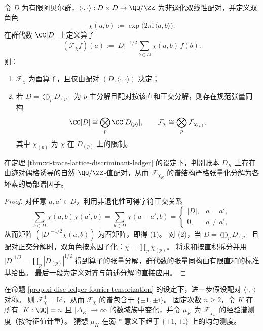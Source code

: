 \begin{proposition}[判别账本的规范有限傅里叶算子与素分解张量化]\label{prop:xi-disc-ledger-fourier-tensorization}
令 \(D\) 为有限阿贝尔群，\(\langle\cdot,\cdot\rangle:D\times D\to \QQ/\ZZ\) 为非退化双线性配对，并定义双角色
\[
\chi(a,b):=\exp\!\bigl(2\pi \mathrm{i}\,\langle a,b\rangle\bigr).
\]
在群代数 \(\CC[D]\) 上定义算子
\[
(\mathcal F_\chi f)(a):=|D|^{-1/2}\sum_{b\in D}\chi(a,b)\,f(b).
\]
则：
\begin{enumerate}
  \item \(\mathcal F_\chi\) 为酉算子，且仅由配对 \((D,\langle\cdot,\cdot\rangle)\) 决定；
  \item 若 \(D=\bigoplus_{p}D_{(p)}\) 为 \(p\)-主分解且配对按该直和正交分解，则存在规范张量同构
  \[
  \CC[D]\cong \bigotimes_p \CC[D_{(p)}],
  \qquad
  \mathcal F_\chi\cong \bigotimes_p \mathcal F_{\chi_{(p)}},
  \]
  其中 \(\chi_{(p)}\) 为 \(\chi\) 在 \(D_{(p)}\) 上的限制。
\end{enumerate}
在定理 \ref{thm:xi-trace-lattice-discriminant-ledger} 的设定下，判别账本 \(D_K\) 上存在由迹对偶格诱导的自然 \(\QQ/\ZZ\)-值配对，从而 \(\mathcal F_{\chi_K}\) 的谱结构严格张量化分解为各坏素的局部谱因子。
\end{proposition}
\begin{proof}
对任意 \(a,a'\in D\)，利用非退化性可得字符正交关系
\[
\sum_{b\in D}\chi(a,b)\overline{\chi(a',b)}=
\sum_{b\in D}\chi(a-a',b)=
\begin{cases}
|D|,& a=a',\\
0,& a\neq a',
\end{cases}
\]
从而矩阵 \((|D|^{-1/2}\chi(a,b))\) 为酉矩阵，即得 (1)。
对 (2)，当 \(D=\bigoplus_p D_{(p)}\) 且配对正交分解时，双角色按素因子化：\(\chi=\prod_p \chi_{(p)}\)。
将求和按直积拆分并用 \(|D|^{1/2}=\prod_p |D_{(p)}|^{1/2}\) 得到算子的张量分解，群代数的张量同构由有限直和的标准基给出。
最后一段为定义对齐与前述分解的直接应用。
\end{proof}

\begin{conjecture}[判别账本相位谱的四点均匀性]\label{conj:xi-disc-ledger-fourier-spectrum-fourpoint}
在命题 \ref{prop:xi-disc-ledger-fourier-tensorization} 的设定下，进一步假设配对 \(\langle\cdot,\cdot\rangle\) 对称。
则 \(\mathcal F_\chi^4=\mathrm{Id}\)，从而 \(\mathcal F_\chi\) 的谱包含于 \(\{\pm 1,\pm \mathrm{i}\}\)。
固定次数 \(n\ge 2\)，令 \(K\) 在所有 \([K:\QQ]=n\) 且 \(|\Delta_K|\to\infty\) 的数域族中变化，并令 \(\mu_K\) 为 \(\mathcal F_{\chi_K}\) 的经验谱测度（按特征值计重）。
猜想 \(\mu_K\) 在弱-\(\ast\) 意义下趋于 \(\{\pm 1,\pm \mathrm{i}\}\) 上的均匀测度。
\end{conjecture}
